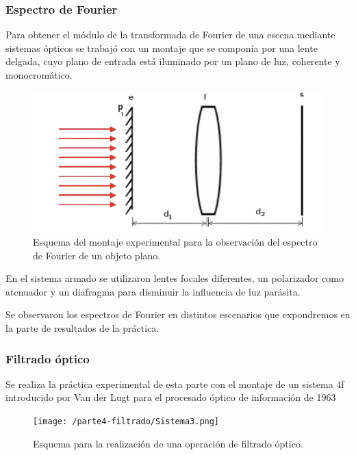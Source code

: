 \documentclass{./packages/optica-article}
\begin{document}
\subsubsection{Espectro de Fourier}

Para obtener el módulo de la transformada de Fourier de una escena mediante sistemas ópticos se trabajó con un montaje que se componía por una lente delgada, cuyo plano de entrada está iluminado por un plano de luz, coherente y monocromático.

\begin{figure}[h]
	\centering
	\includegraphics[scale=1]{sistemaespectrodefourier.png}
	\caption{Esquema del montaje experimental para la observación del espectro de Fourier de un objeto plano. }
	\label{fouriersistema}
\end{figure}

En el sistema armado se utilizaron lentes focales diferentes, un polarizador como atenuador y un diafragma para disminuir la influencia de luz parásita.

Se observaron los espectros de Fourier en distintos escenarios que expondremos en la parte de resultados de la práctica.

\subsubsection{Filtrado óptico}

Se realiza la práctica experimental de esta parte con el montaje de un sistema 4f introducido por Van der Lugt para el procesado óptico de información de 1963

\begin{figure}[h]
	\centering
	\texttt{[image: /parte4-filtrado/Sistema3.png]}
	\caption{Esquema para la realización de una operación de filtrado óptico.}
	\label{filtradoopticosistema}
\end{figure}
\end{document}
